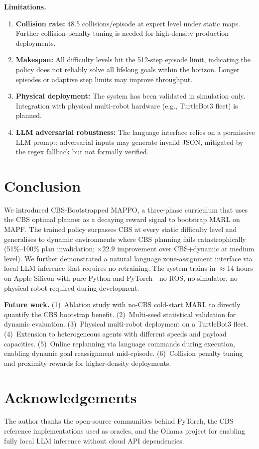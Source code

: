 \documentclass[letterpaper,twocolumn,10pt]{article}
\begin{document}
\textbf{Limitations.}
\begin{enumerate}[leftmargin=*,itemsep=2pt,topsep=2pt]
  \item \textbf{Collision rate:} 48.5 collisions/episode at expert level under static
    maps. Further collision-penalty tuning is needed for high-density production
    deployments.
  \item \textbf{Makespan:} All difficulty levels hit the 512-step episode limit,
    indicating the policy does not reliably solve all lifelong goals within the horizon.
    Longer episodes or adaptive step limits may improve throughput.
  \item \textbf{Physical deployment:} The system has been validated in simulation only.
    Integration with physical multi-robot hardware (e.g., TurtleBot3 fleet) is planned.
  \item \textbf{LLM adversarial robustness:} The language interface relies on a
    permissive LLM prompt; adversarial inputs may generate invalid JSON, mitigated
    by the regex fallback but not formally verified.
\end{enumerate}

\section{Conclusion}

We introduced CBS-Bootstrapped MAPPO, a three-phase curriculum that uses the CBS
optimal planner as a decaying reward signal to bootstrap MARL on MAPF. The trained
policy surpasses CBS at every static difficulty level and generalises to dynamic
environments where CBS planning fails catastrophically (51\%--100\% plan invalidation;
$\times 22.9$ improvement over CBS+dynamic at medium level). We further demonstrated
a natural language zone-assignment interface via local LLM inference that requires no
retraining. The system trains in $\approx$14 hours on Apple Silicon with pure Python
and PyTorch---no ROS, no simulator, no physical robot required during development.

\textbf{Future work.}
(1)~Ablation study with no-CBS cold-start MARL to directly quantify the CBS bootstrap
benefit. (2)~Multi-seed statistical validation for dynamic evaluation. (3)~Physical
multi-robot deployment on a TurtleBot3 fleet. (4)~Extension to heterogeneous agents
with different speeds and payload capacities. (5)~Online replanning via language
commands during execution, enabling dynamic goal reassignment mid-episode.
(6)~Collision penalty tuning and proximity rewards for higher-density deployments.

\section*{Acknowledgements}
The author thanks the open-source communities behind PyTorch, the CBS reference
implementations used as oracles, and the Ollama project for enabling fully local LLM
inference without cloud API dependencies.



\end{document}
